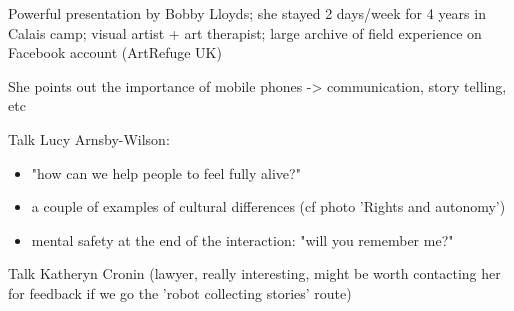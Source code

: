 \documentclass[11pt]{article}
\begin{document}
Powerful presentation by Bobby Lloyds; she stayed 2 days/week for 4 years in
Calais camp; visual artist + art therapist; large archive of field experience on
Facebook account (ArtRefuge UK)

She points out the importance of mobile phones -> communication, story telling,
etc

Talk Lucy Arnsby-Wilson:

\begin{itemize}
    \item "how can we help people to feel fully alive?"
    \item a couple of examples of cultural differences (cf photo 'Rights and
        autonomy')
    \item mental safety at the end of the interaction: "will you remember me?"
\end{itemize}

Talk Katheryn Cronin (lawyer, really interesting, might be worth contacting her
for feedback if we go the 'robot collecting stories' route)
\end{document}
